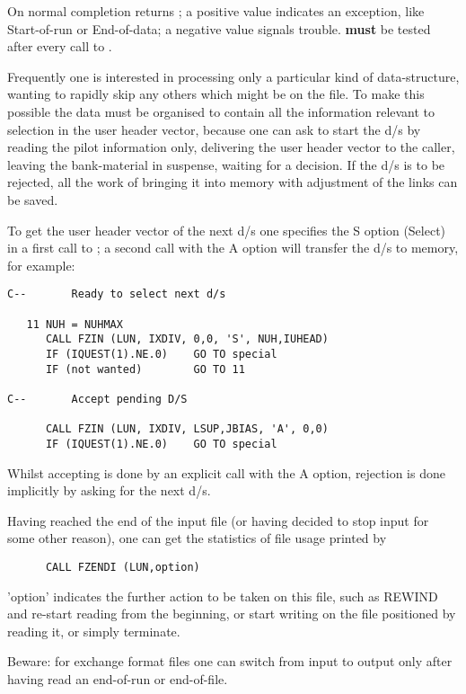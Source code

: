On normal completion  returns ;
a positive value indicates an exception,
like Start-of-run or End-of-data;
a negative value signals trouble.
 \textbf{must} be tested after every call to .

Frequently one is interested in processing only a particular
kind of data-structure, wanting to rapidly skip any others
which might be on the file.
To make this possible the data must be organised to contain
all the information relevant to selection in the user header vector,
because one can ask  to start the d/s by reading
the pilot information only, delivering the user header vector to
the caller, leaving the bank-material in suspense,
waiting for a decision.
If the d/s is to be rejected, all the work of bringing
it into memory with adjustment of the links can be saved.

To get the user header vector of the next d/s one specifies
the S option (Select) in a first call to ;
a second call with the A option will transfer the d/s to memory,
for example:
\begin{verbatim}
C--       Ready to select next d/s

   11 NUH = NUHMAX
      CALL FZIN (LUN, IXDIV, 0,0, 'S', NUH,IUHEAD)
      IF (IQUEST(1).NE.0)    GO TO special
      IF (not wanted)        GO TO 11

C--       Accept pending D/S

      CALL FZIN (LUN, IXDIV, LSUP,JBIAS, 'A', 0,0)
      IF (IQUEST(1).NE.0)    GO TO special
\end{verbatim}
Whilst accepting is done by an explicit call with the A option,
rejection is done implicitly by asking for the next d/s.

Having reached the end of the input file (or having decided
to stop input for some other reason),
one can get the statistics of file usage printed by
\begin{verbatim}
      CALL FZENDI (LUN,option)
\end{verbatim}
'option' indicates the further action to be taken on this file,
such as REWIND and re-start reading from the beginning,
or start writing on the file positioned by reading it,
or simply terminate.

Beware: for exchange format files one can switch from input
to output only after having read an end-of-run or end-of-file.

